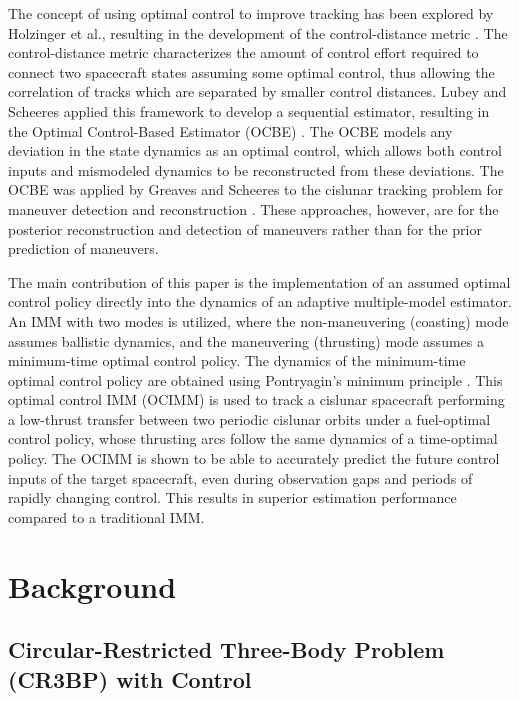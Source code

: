 \documentclass[letterpaper, preprint, paper,11pt]{AAS}	%
\begin{document}
The concept of using optimal control to improve tracking has been explored by Holzinger et al., resulting in the development of the control-distance metric \cite{holzinger2012object}. The control-distance metric characterizes the amount of control effort required to connect two spacecraft states assuming some optimal control, thus allowing the correlation of tracks which are separated by smaller control distances. Lubey and Scheeres applied this framework to develop a sequential estimator, resulting in the Optimal Control-Based Estimator (OCBE) \cite{lubey2013optimal}. The OCBE models any deviation in the state dynamics as an optimal control, which allows both control inputs and mismodeled dynamics to be reconstructed from these deviations. The OCBE was applied by Greaves and Scheeres to the cislunar tracking problem for maneuver detection and reconstruction \cite{greaves2021observation}. These approaches, however, are for the posterior reconstruction and detection of maneuvers rather than for the prior prediction of maneuvers. 

The main contribution of this paper is the implementation of an assumed optimal control policy directly into the dynamics of an adaptive multiple-model estimator. An IMM with two modes is utilized, where the non-maneuvering (coasting) mode assumes ballistic dynamics, and the maneuvering (thrusting) mode assumes a minimum-time optimal control policy. The dynamics of the minimum-time optimal control policy are obtained using Pontryagin's minimum principle \cite{pontryagin1962}. This optimal control IMM (OCIMM) is used to track a cislunar spacecraft performing a low-thrust transfer between two periodic cislunar orbits under a fuel-optimal control policy, whose thrusting arcs follow the same dynamics of a time-optimal policy. The OCIMM is shown to be able to accurately predict the future control inputs of the target spacecraft, even during observation gaps and periods of rapidly changing control. This results in superior estimation performance compared to a traditional IMM. 

\section{Background}

\subsection{Circular-Restricted Three-Body Problem (CR3BP) with Control}
\end{document}
